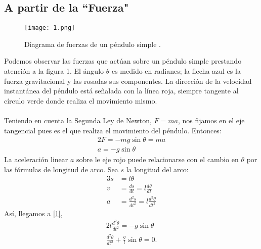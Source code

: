 \documentclass[12pt]{article}
\begin{document}
\subsection{A partir de la ``Fuerza"}
\begin{wrapfigure}{r}{0.4\textwidth}
\begin{center}
\texttt{[image: 1.png]}
\end{center}
\caption{Diagrama de fuerzas de un péndulo simple \cite{1}.}
\end{wrapfigure}
Podemos observar las fuerzas que actúan sobre un péndulo simple prestando atención a la figura 1. El ángulo $\theta$ es medido en radianes; la flecha azul es la fuerza gravitacional y las rosadas sus componentes. La dirección de la velocidad instantánea del péndulo está señalada con la línea roja, siempre tangente al círculo verde donde realiza el movimiento mismo. \\\\
Teniendo en cuenta la Segunda Ley de Newton, $F=ma$, nos fijamos en el eje tangencial pues es el que realiza el movimiento del péndulo. Entonces:
\begin{alignat}{2}
F=-mg\sin\theta=ma \\
a=-g\sin\theta
\end{alignat}
La aceleración linear $a$ sobre le eje rojo puede relacionarse con el cambio en $\theta$ por las fórmulas de longitud de arco. Sea $s$ la longitud del arco:
\begin{alignat}{3}
s&=l\theta \\
v&=\frac{ds}{dt}=l\frac{d\theta}{dt} \\
a&=\frac{d^2s}{dt^2}=l\frac{d^2\theta}{dt^2}
\end{alignat}
Así, llegamos a \eqref{1},
\begin{alignat}{2}
l\frac{d^2\theta}{dt^2}=-g\sin\theta \\
\frac{d^2\theta}{dt^2}+\frac{g}{l}\sin\theta=0.
\end{alignat}
\end{document}
